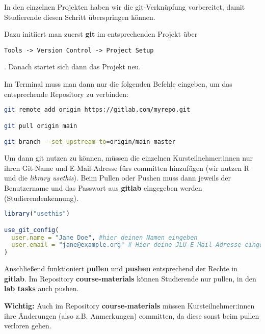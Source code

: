 \documentclass[11pt,a4paper]{article}
\begin{document}
In den einzelnen Projekten haben wir die git-Verknüpfung vorbereitet, damit Studierende diesen Schritt überspringen können. 

Dazu initiiert man zuerst \textbf{git} im entsprechenden Projekt über \begin{verbatim}Tools -> Version Control -> Project Setup \end{verbatim}. Danach startet sich dann das Projekt neu. 

Im Terminal muss man dann nur die folgenden Befehle eingeben, um das entsprechende Repository zu verbinden:

\begin{lstlisting}[language=bash]
git remote add origin https://gitlab.com/myrepo.git

git pull origin main

git branch --set-upstream-to=origin/main master
\end{lstlisting}

Um dann git nutzen zu können, müssen die einzelnen Kursteilnehmer:innen nur ihren Git-Name und E-Mail-Adresse fürs committen hinzufügen (wir nutzen R und die \textit{library usethis}). Beim Pullen oder Pushen muss dann jeweils der Benutzername und das Passwort aus \textbf{gitlab} eingegeben werden (Studierendenkennung).

\begin{lstlisting}[language=R]
library("usethis")

use_git_config( 
  user.name = "Jane Doe", #hier deinen Namen eingeben
  user.email = "jane@example.org" # Hier deine JLU-E-Mail-Adresse eingeben
)
\end{lstlisting}

Anschließend funktioniert \textbf{pullen} und \textbf{pushen} entsprechend der Rechte in \textbf{gitlab}. Im Repository \textbf{course-materials} können Studierende nur pullen, in den \textbf{lab tasks} auch pushen. 

\textbf{Wichtig:} Auch im Repository \textbf{course-materials} müssen Kursteilnehmer:innen ihre Änderungen (also z.B. Anmerkungen) committen, da diese sonst beim pullen verloren gehen. 
\end{document}

